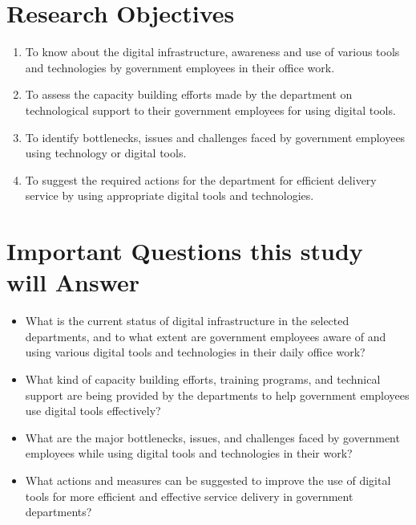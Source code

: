 \documentclass[11pt,a4paper]{article}
\begin{document}
\section{Research Objectives}

\vspace{0.2cm}
\begin{navybox}
\begin{enumerate}[label={\color{gold}\bfseries\arabic*.},itemsep=4pt]
  \item To know about the digital infrastructure, awareness and use of various tools and technologies by government employees in their office work.
  \item To assess the capacity building efforts made by the department on technological support to their government employees for using digital tools.
  \item To identify bottlenecks, issues and challenges faced by government employees using technology or digital tools.
  \item To suggest the required actions for the department for efficient delivery service by using appropriate digital tools and technologies.
\end{enumerate}
\end{navybox}

\section{Important Questions this study will Answer}

\vspace{0.2cm}
\begin{itemize}[leftmargin=1.2em, itemsep=6pt]
  \item What is the current status of digital infrastructure in the selected departments, and to what extent are government employees aware of and using various digital tools and technologies in their daily office work?
  \item What kind of capacity building efforts, training programs, and technical support are being provided by the departments to help government employees use digital tools effectively?
  \item What are the major bottlenecks, issues, and challenges faced by government employees while using digital tools and technologies in their work?
  \item What actions and measures can be suggested to improve the use of digital tools for more efficient and effective service delivery in government departments?
\end{itemize}
\end{document}
